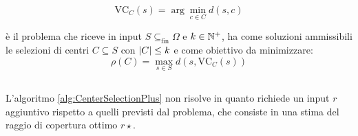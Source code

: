 \begin{equation*}
	\text{VC}_C(s)=\arg\min_{c\in C} d(s,c)
\end{equation*}

\CenterSelection è il problema che riceve in input $S\subseteq_\text{fin}\Omega$ e $k\in\mathbb N^+$, ha come soluzioni ammissibili le selezioni di centri $C\subseteq S$ con $| C |\leq k$ e come obiettivo da minimizzare:
\begin{equation*}
	\rho(C)=\max_{s\in S} d(s,\text{VC}_C(s))
\end{equation*}

\subsection{\CenterSelectionPlus}
L'algoritmo \ref{alg:CenterSelectionPlus} non risolve \CenterSelection in quanto richiede un input $r$ aggiuntivo rispetto a quelli previsti dal problema, che consiste in una stima del raggio di copertura ottimo $r\star$.

\begin{algorithm}[ht]
	\caption{\CenterSelectionPlus}
	\label{alg:CenterSelectionPlus}
	
\end{algorithm}

